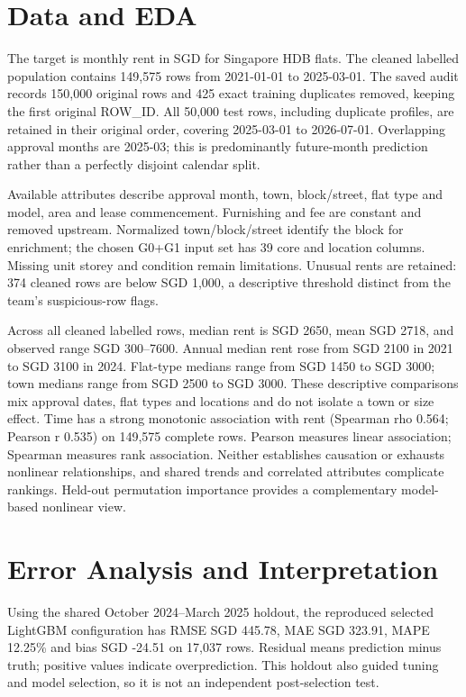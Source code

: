 \section{Data and EDA}
The target is monthly rent in SGD for Singapore HDB flats. The cleaned labelled population contains 149,575 rows from 2021-01-01 to 2025-03-01. The saved audit records 150,000 original rows and 425 exact training duplicates removed, keeping the first original ROW\_ID. All 50,000 test rows, including duplicate profiles, are retained in their original order, covering 2025-03-01 to 2026-07-01. Overlapping approval months are 2025-03; this is predominantly future-month prediction rather than a perfectly disjoint calendar split.

Available attributes describe approval month, town, block/street, flat type and model, area and lease commencement. Furnishing and fee are constant and removed upstream. Normalized town/block/street identify the block for enrichment; the chosen G0+G1 input set has 39 core and location columns. Missing unit storey and condition remain limitations. Unusual rents are retained: 374 cleaned rows are below SGD 1,000, a descriptive threshold distinct from the team's suspicious-row flags.

Across all cleaned labelled rows, median rent is SGD 2650, mean SGD 2718, and observed range SGD 300--7600. Annual median rent rose from SGD 2100 in 2021 to SGD 3100 in 2024. Flat-type medians range from SGD 1450 to SGD 3000; town medians range from SGD 2500 to SGD 3000. These descriptive comparisons mix approval dates, flat types and locations and do not isolate a town or size effect. Time has a strong monotonic association with rent (Spearman rho 0.564; Pearson r 0.535) on 149,575 complete rows. Pearson measures linear association; Spearman measures rank association. Neither establishes causation or exhausts nonlinear relationships, and shared trends and correlated attributes complicate rankings. Held-out permutation importance provides a complementary model-based nonlinear view.

\section{Error Analysis and Interpretation}
Using the shared October 2024--March 2025 holdout, the reproduced selected LightGBM configuration has RMSE SGD 445.78, MAE SGD 323.91, MAPE 12.25\% and bias SGD -24.51 on 17,037 rows. Residual means prediction minus truth; positive values indicate overprediction. This holdout also guided tuning and model selection, so it is not an independent post-selection test.

